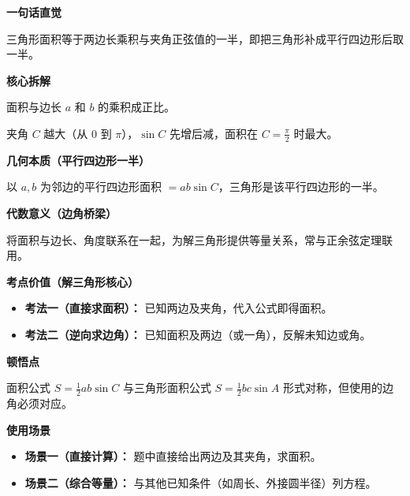 \begin{explanationbox}
	\textbf{\textcolor{CExplanation}{一句话直觉}}

	三角形面积等于两边长乘积与夹角正弦值的一半，即把三角形补成平行四边形后取一半。

	\medskip
	\textbf{\textcolor{CExplanation}{核心拆解}}
	\begin{description}[style=nextline, leftmargin=2.8em, labelsep=0.5em, itemsep=0.45em]
		\item[\textbf{要点一（正比于两边长）：}] 面积与边长 $a$ 和 $b$ 的乘积成正比。
		\item[\textbf{要点二（正比于夹角正弦）：}] 夹角 $C$ 越大（从 $0$ 到 $\pi$），$\sin C$ 先增后减，面积在 $C=\frac{\pi}{2}$ 时最大。
	\end{description}

	\medskip
	\textbf{\textcolor{CExplanation}{几何本质（平行四边形一半）}}

	以 $a,b$ 为邻边的平行四边形面积 $= ab\sin C$，三角形是该平行四边形的一半。

	\medskip
	\textbf{\textcolor{CExplanation}{代数意义（边角桥梁）}}

	将面积与边长、角度联系在一起，为解三角形提供等量关系，常与正余弦定理联用。

	\medskip
	\textbf{\textcolor{CExplanation}{考点价值（解三角形核心）}}
	\begin{itemize}[leftmargin=*, itemsep=0.5em, topsep=0.4em]
		\item \textbf{考法一（直接求面积）：} 已知两边及夹角，代入公式即得面积。
		\item \textbf{考法二（逆向求边角）：} 已知面积及两边（或一角），反解未知边或角。
	\end{itemize}

	\medskip
	\textbf{\textcolor{CExplanation}{顿悟点}}

	面积公式 $S=\frac12 ab\sin C$ 与三角形面积公式 $S=\frac12 bc\sin A$ 形式对称，但使用的边角必须对应。

	\medskip
	\textbf{\textcolor{CExplanation}{使用场景}}
	\begin{itemize}[leftmargin=*, itemsep=0.5em, topsep=0.4em]
		\item \textbf{场景一（直接计算）：} 题中直接给出两边及其夹角，求面积。
		\item \textbf{场景二（综合等量）：} 与其他已知条件（如周长、外接圆半径）列方程。
	\end{itemize}
\end{explanationbox}
